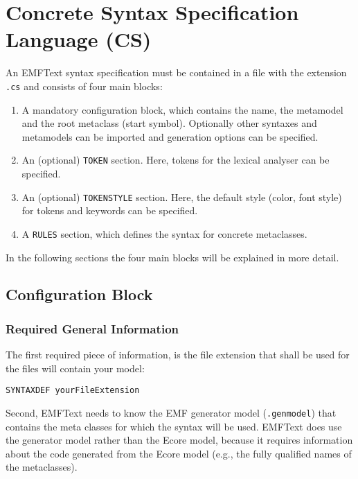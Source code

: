 \chapter{Concrete Syntax Specification Language (CS)}

An EMFText syntax specification must be contained in a file with the extension
\texttt{.cs} and consists of four main blocks:

\begin{enumerate}
  \item A mandatory configuration block, which contains the name, the metamodel
  and the root metaclass (start symbol). Optionally other syntaxes and
  metamodels can be imported and generation options can be specified.
  \item An (optional) \texttt{TOKEN} section. Here, tokens for the lexical
        analyser can be specified.
  \item An (optional) \texttt{TOKENSTYLE} section. Here, the default style
        (color, font style) for tokens and keywords can be specified.
  \item A \texttt{RULES} section, which defines the syntax for concrete
        metaclasses.
\end{enumerate}

In the following sections the four main blocks will be explained in more detail.

\section{Configuration Block}

\subsection{Required General Information}

The first required piece of information, is the file extension that shall
be used for the files will contain your model:

\begin{lstlisting}
SYNTAXDEF yourFileExtension
\end{lstlisting} 

Second, EMFText needs to know the EMF generator model (\texttt{.genmodel}) that
contains the meta classes for which the syntax will be used. EMFText does use
the generator model rather than the Ecore model, because it requires
information about the code generated from the Ecore model (e.g., the fully
qualified names of the metaclasses). 

